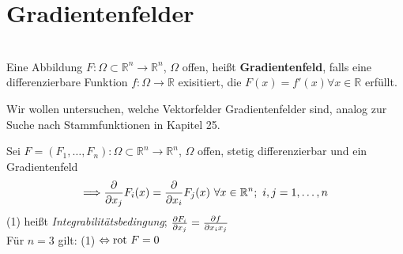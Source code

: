 \section{Gradientenfelder}

\begin{definition}[Gradientenfeld]
\mbox{}\\
Eine Abbildung $F: \Omega \subset \mathbb{R}^n \rightarrow \mathbb{R}^n $,
$\Omega $ offen, heißt \textbf{Gradientenfeld},
falls eine differenzierbare Funktion $f: \Omega \rightarrow \mathbb{R} $ exisitiert,
die $F(x) = f'(x) \forall x \in \mathbb{R} $ erfüllt.
\end{definition}

Wir wollen untersuchen, welche Vektorfelder Gradientenfelder sind, analog zur Suche
nach Stammfunktionen in Kapitel 25.

\begin{satz}

Sei $F = (F_1, \ldots, F_n): \Omega \subset \mathbb{R}^n \rightarrow \mathbb{R}^n$,
$\Omega $ offen, stetig differenzierbar und ein Gradientenfeld
\begin{equation}
    \Longrightarrow
    \frac{\partial{}}{\partial{x_j}} F_i (x) = \frac{\partial{}}{\partial{x_i}} F_j (x) \ \forall x \in \mathbb{R}^n; \
    i,j = 1, \ldots, n
\end{equation}
(1) heißt \emph{Integrabilitätsbedingung}; $\frac{\partial{F_i}}{\partial{x_j}} = \frac{\partial{f}}{\partial{x_i x_j}} $\\
Für $n=3 $ gilt: (1) $ \Leftrightarrow \mathrm{rot\ } F = 0 $
\end{satz}

